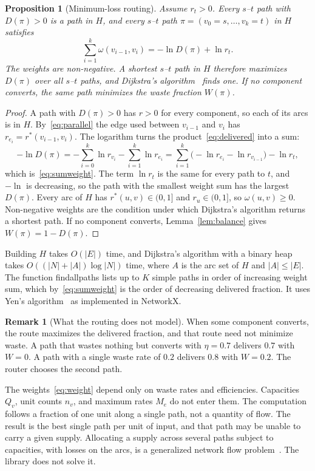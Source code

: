 \documentclass[12pt]{article}
\newcommand{\code}[1]{{\ttfamily\def\_{\textunderscore\allowbreak}#1}}
\theoremstyle{plain}
\newtheorem{proposition}[theorem]{Proposition}
\theoremstyle{definition}
\newtheorem{remark}{Remark}
\begin{document}
\begin{proposition}[Minimum-loss routing]\label{prop:routing}
Assume $r_t>0$. Every $s$--$t$ path with $D(\pi)>0$ is a path in $H$, and every $s$--$t$ path $\pi=(v_0=s,\dots,v_k=t)$ in $H$ satisfies
\begin{equation}\label{eq:sumweight}
    \sum_{i=1}^{k}\omega(v_{i-1},v_i)=-\ln D(\pi)+\ln r_t .
\end{equation}
The weights are non-negative. A shortest $s$--$t$ path in $H$ therefore maximizes $D(\pi)$ over all $s$--$t$ paths, and Dijkstra's algorithm~\cite{dijkstra1959note} finds one. If no component converts, the same path minimizes the waste fraction $W(\pi)$.
\end{proposition}
\begin{proof}
A path with $D(\pi)>0$ has $r>0$ for every component, so each of its arcs is in $H$. By~\eqref{eq:parallel} the edge used between $v_{i-1}$ and $v_i$ has $r_{e_i}=r^*(v_{i-1},v_i)$. The logarithm turns the product~\eqref{eq:delivered} into a sum:
\[
    -\ln D(\pi)=-\sum_{i=0}^{k}\ln r_{v_i}-\sum_{i=1}^{k}\ln r_{e_i}
    =\sum_{i=1}^{k}\bigl(-\ln r_{e_i}-\ln r_{v_{i-1}}\bigr)-\ln r_t ,
\]
which is~\eqref{eq:sumweight}. The term $\ln r_t$ is the same for every path to $t$, and $-\ln$ is decreasing, so the path with the smallest weight sum has the largest $D(\pi)$. Every arc of $H$ has $r^*(u,v)\in(0,1]$ and $r_u\in(0,1]$, so $\omega(u,v)\geq 0$. Non-negative weights are the condition under which Dijkstra's algorithm returns a shortest path. If no component converts, Lemma~\ref{lem:balance} gives $W(\pi)=1-D(\pi)$.
\end{proof}

Building $H$ takes $O(|E|)$ time, and Dijkstra's algorithm with a binary heap takes $O((|N|+|A|)\log|N|)$ time, where $A$ is the arc set of $H$ and $|A|\leq|E|$. The function \code{find\_all\_paths} lists up to $K$ simple paths in order of increasing weight sum, which by~\eqref{eq:sumweight} is the order of decreasing delivered fraction. It uses Yen's algorithm~\cite{yen1971finding} as implemented in NetworkX.

\begin{remark}[What the routing does not model]\label{rem:routing}
When some component converts, the route maximizes the delivered fraction, and that route need not minimize waste. A path that wastes nothing but converts with $\eta=0.7$ delivers $0.7$ with $W=0$. A path with a single waste rate of $0.2$ delivers $0.8$ with $W=0.2$. The router chooses the second path.

The weights~\eqref{eq:weight} depend only on waste rates and efficiencies. Capacities $Q_v$, unit counts $n_v$, and maximum rates $M_e$ do not enter them. The computation follows a fraction of one unit along a single path, not a quantity of flow. The result is the best single path per unit of input, and that path may be unable to carry a given supply. Allocating a supply across several paths subject to capacities, with losses on the arcs, is a generalized network flow problem~\cite{ahuja1993network}. The library does not solve it.
\end{remark}
\end{document}

